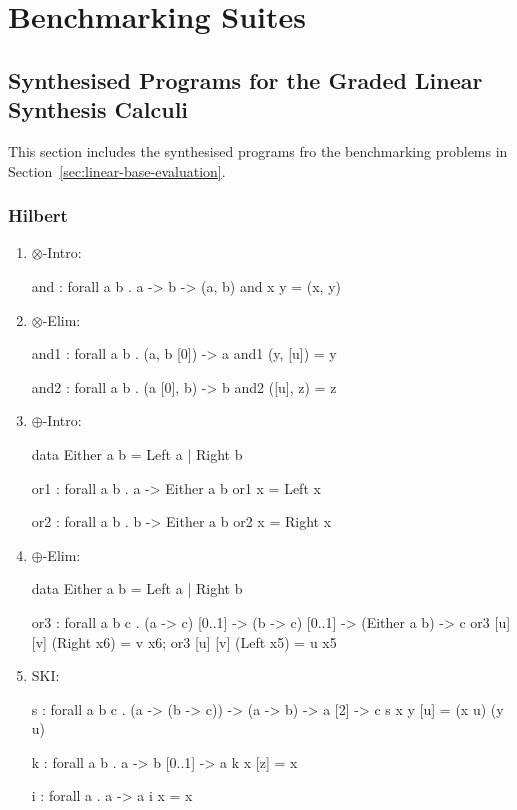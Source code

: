 \chapter{Benchmarking Suites}
\label{appendix:benchmarks}

\section{Synthesised Programs for the Graded Linear Synthesis Calculi}
\label{sec:linear-benchmarks}
This section includes the synthesised programs fro the benchmarking problems in
Section~\ref{sec:linear-base-evaluation}. 

\subsection{Hilbert}
\begin{enumerate}
\item $\otimes$-Intro:
\begin{granule}
and : forall a b . a -> b -> (a, b)
and x y = (x, y)
\end{granule}
\item $\otimes$-Elim: \\ 
\begin{granule}
and1 : forall a b .  (a, b [0]) -> a
and1 (y, [u]) = y
    
and2 : forall a b . (a [0], b) -> b
and2 ([u], z) = z
\end{granule}
\item $\oplus$-Intro: 
\begin{granule}
data Either a b = Left a | Right b

or1 : forall a b . a -> Either a b
or1 x = Left x

or2 : forall a b . b -> Either a b
or2 x = Right x
\end{granule}
\item $\oplus$-Elim: 
\begin{granule}
data Either a b = Left a | Right b

or3 : forall a b c 
    . (a -> c) [0..1] 
    -> (b -> c) [0..1] 
    -> (Either a b) 
    -> c
or3 [u] [v] (Right x6) = v x6;
or3 [u] [v] (Left x5) = u x5
\end{granule}
\item SKI: 
\begin{granule}
s : forall a b c  
  . (a -> (b -> c)) 
  -> (a -> b) 
  -> a [2] 
  -> c
s x y [u] = (x u) (y u)
    
k : forall a b . a -> b [0..1] -> a
k x [z] = x
    
i : forall a . a -> a
i x = x
\end{granule}
\end{enumerate}


